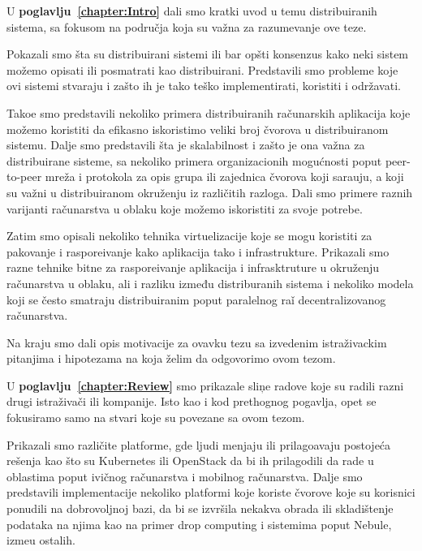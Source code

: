 U \textbf{poglavlju~\ref{chapter:Intro}} dali smo kratki uvod u temu distribuiranih sistema, sa fokusom na podru\v cja koja su va\v zna za razumevanje ove teze.

Pokazali smo \v sta su distribuirani sistemi ili bar op\v sti konsenzus kako neki sistem mo\v zemo opisati ili posmatrati kao distribuirani. Predstavili smo probleme koje ovi sistemi stvaraju i za\v sto ih je tako te\v sko implementirati, koristiti i odr\v zavati.

Tako\dj e smo predstavili nekoliko primera distribuiranih ra\v cunarskih aplikacija koje možemo koristiti da efikasno iskoristimo veliki broj \v cvorova u distribuiranom sistemu. Dalje smo predstavili \v sta je skalabilnost i za\v sto je ona va\v zna za distribuirane sisteme, sa nekoliko primera organizacionih mogu\'cnosti poput peer-to-peer mre\v za i protokola za opis grupa ili zajednica \v cvorova koji sara\dj uju, a koji su va\v zni u distribuiranom okru\v zenju iz razli\v citih razloga. Dali smo primere raznih varijanti ra\v cunarstva u oblaku koje mo\v zemo iskoristiti za svoje potrebe.

Zatim smo opisali nekoliko tehnika virtuelizacije koje se mogu koristiti za pakovanje i raspore\dj ivanje kako aplikacija tako i infrastrukture. Prikazali smo razne tehnike bitne za raspore\dj ivanje aplikacija i infrasktruture u okru\v zenju ra\v cunarstva u oblaku, ali i razliku između distriburanih sistema i nekoliko modela koji se \v cesto smatraju distribuiranim poput paralelnog ra\v i decentralizovanog ra\v cunarstva.

Na kraju smo dali opis motivacije za ovavku tezu sa izvedenim istra\v zivackim pitanjima i hipotezama na koja \v zelim da odgovorimo ovom tezom.

U \textbf{poglavlju~\ref{chapter:Review}} smo prikazale sli\c ne radove koje su radili razni drugi istra\v ziva\v ci ili kompanije. Isto kao i kod prethognog pogavlja, opet se fokusiramo samo na stvari koje su povezane sa ovom tezom.

Prikazali smo razli\v cite platforme, gde ljudi menjaju ili prilago\dj avaju postoje\'ca re\v senja kao \v sto su Kubernetes ili OpenStack da bi ih prilagodili da rade u oblastima poput ivi\v cnog ra\v cunarstva i mobilnog ra\v cunarstva. Dalje smo predstavili implementacije nekoliko platformi koje koriste \v cvorove koje su korisnici ponudili na dobrovoljnoj bazi, da bi se izvr\v sila nekakva obrada ili skladi\v stenje podataka na njima kao na primer drop computing i sistemima poput Nebule, izme\dj u ostalih.

